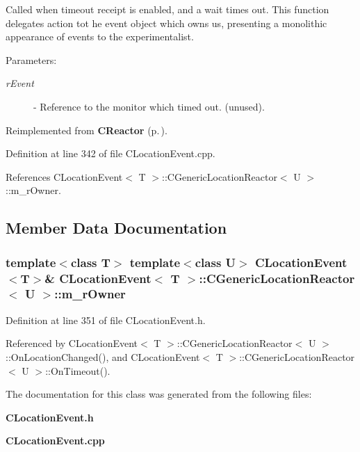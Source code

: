 Called when timeout receipt is enabled, and a wait times out.  This function delegates action tot he event object which owns us, presenting a monolithic appearance of events to the experimentalist.\begin{Desc}
\item[Parameters: ]\par
\begin{description}
\item[{\em 
r\-Event}]- Reference to the monitor which timed out. (unused). \end{description}
\end{Desc}


Reimplemented from {\bf CReactor} {\rm (p.\,\pageref{classCReactor_a8})}.

Definition at line 342 of file CLocation\-Event.cpp.

References CLocation\-Event$<$ T $>$::CGeneric\-Location\-Reactor$<$ U $>$::m\_\-r\-Owner.

\subsection{Member Data Documentation}
\subsubsection{\setlength{\rightskip}{0pt plus 5cm}template$<$class T$>$ template$<$class U$>$ {\bf CLocation\-Event}$<$T$>$\& {\bf CLocation\-Event}$<$ T $>$::CGeneric\-Location\-Reactor$<$ U $>$::m\_\-r\-Owner\hspace{0.3cm}{\tt  [private]}}\label{classCLocationEvent_1_1CGenericLocationReactor_o0}




Definition at line 351 of file CLocation\-Event.h.

Referenced by CLocation\-Event$<$ T $>$::CGeneric\-Location\-Reactor$<$ U $>$::On\-Location\-Changed(), and CLocation\-Event$<$ T $>$::CGeneric\-Location\-Reactor$<$ U $>$::On\-Timeout().

The documentation for this class was generated from the following files:\begin{CompactItemize}
\item 
{\bf CLocation\-Event.h}\item 
{\bf CLocation\-Event.cpp}\end{CompactItemize}
